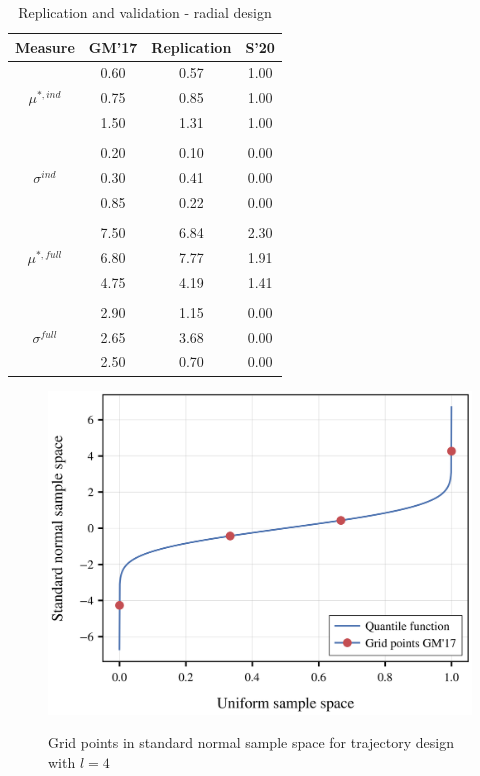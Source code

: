 \documentclass[a4paper,12pt]{article}
\begin{document}
\hspace{1cm} %
\setlength{\tabcolsep}{12pt} %
\begin{table}[H]
	\centering
	\caption{Replication and validation - radial design}
	\label{tab:repval2}
	\renewcommand{\arraystretch}{1.2}%
	\begin{tabular}{cS[table-format=3.2]S[table-format=3.2]S[table-format=3.2]}
		\toprule
		{Measure}     & {GM'17}   & {Replication}  & {S'20} \\ 
		\midrule
		
		& 0.60  & 0.57         &  1.00 \\
		\qquad $\mu^{*,ind}$                               & 0.75  & 0.85         &  1.00 \\
		& 1.50  & 1.31         &  1.00 \\
		&&& \\
		& 0.20   & 0.10         &  0.00 \\
		\qquad $\sigma^{ind}$                            & 0.30   & 0.41         &  0.00 \\
		& 0.85  & 0.22         & 0.00 \\
		&&& \\
		& 7.50  & 6.84         &  2.30 \\
		\qquad $\mu^{*,full}$                              & 6.80   & 7.77         &  1.91 \\
		& 4.75  & 4.19         &  1.41 \\
		&&& \\
		& 2.90  & 1.15         &  0.00 \\
		\qquad $\sigma^{full}$                           & 2.65  & 3.68         &  0.00 \\
		& 2.50   & 0.70         &  0.00 \\ \bottomrule
	\end{tabular}
\end{table}
\newpage
\begin{figure}[H]
	\caption{Grid points in standard normal sample space for trajectory design with $l=4$}
	\centering
	\includegraphics[scale=0.40]{../../../scrypy/figures/quantile_fct}
	\label{fig:invcdf}
\end{figure}
\end{document}
